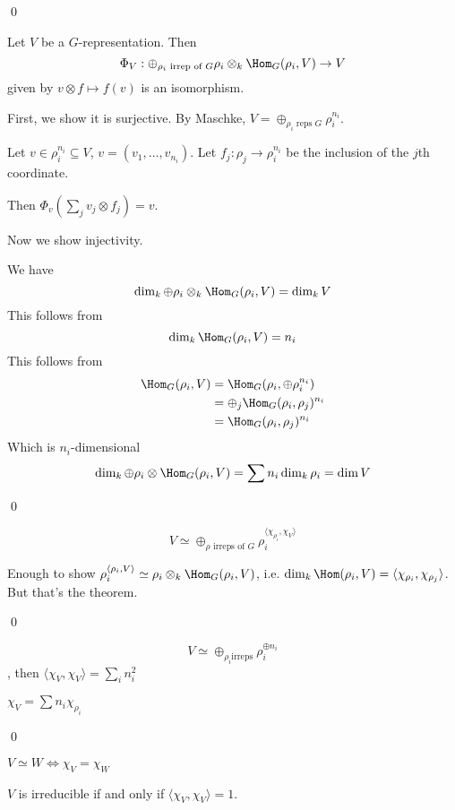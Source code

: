 \documentclass[x11names,reqno,14pt]{extarticle}
\begin{document}
\qed

\prop

Let $V$ be a $G$-representation. Then 
\[
\Phi_V:\oplus_{\rho_i\text{ irrep of }G}\rho_i\otimes_k\Hom_G(\rho_i, V) \to V
\]
given by $v\otimes f \mapsto f(v)$ is an isomorphism. 

\proof

First, we show it is surjective. By Maschke, $V = \oplus_{\rho_i \text{ reps }G}\rho_i^{n_i}$. 

Let $v \in \rho_i^{n_i}\subseteq V$, $v = (v_1, \dots, v_{n_i})$. Let $f_j:\rho_j\to \rho_i^{n_i}$ be the inclusion of the $j$th coordinate.

Then $\Phi_v(\sum_jv_j\otimes f_j) = v$. 

Now we show injectivity. 

We have
\[
\dim_k\oplus\rho_i\otimes_k\Hom_G(\rho_i,V) = \dim_kV
\]
This follows from 
\[
\dim_k\Hom_G(\rho_i,V) = n_i
\]
This follows from 
\begin{align*}
\Hom_G(\rho_i,V) & = \Hom_G(\rho_i,\oplus\rho_i^{n_i}) \\
& = \oplus_j\Hom_G(\rho_i,\rho_j)^{n_i} \\
& = \Hom_G(\rho_i,\rho_j)^{n_i} \\
\end{align*}
Which is $n_i$-dimensional
\[
\dim_k\oplus\rho_i\otimes\Hom_G(\rho_i,V) = \sum n_i\dim_k\rho_i = \dim V
\]

\qed

\cor

\[
V \simeq \oplus_{\rho\text{ irreps of }G}\rho_i^{\langle\chi_{\rho_i},\chi_{V}\rangle}
\]

\proof

Enough to show $\rho_i^{\langle\rho_i,V\rangle } \simeq \rho_i\otimes_k\Hom_G(\rho_i,V)$, i.e. $\dim_k\Hom(\rho_i,V) = \langle\chi_{\rho_i},\chi_{\rho_j}\rangle$. But that's the theorem. 

\qed

\cor

\[
V \simeq \oplus_{\rho_i\text{irreps}}\rho_i^{\oplus n_i}
\]
, then $\langle \chi_V,\chi_V\rangle = \sum_in_i^2$

\proof

$\chi_V = \sum n_i\chi_{\rho_i}$

\qed

\cor

$V \simeq W\iff \chi_V = \chi_W$

\cor

$V$ is irreducible if and only if $\langle\chi_V,\chi_V\rangle = 1$. 
\end{document}
